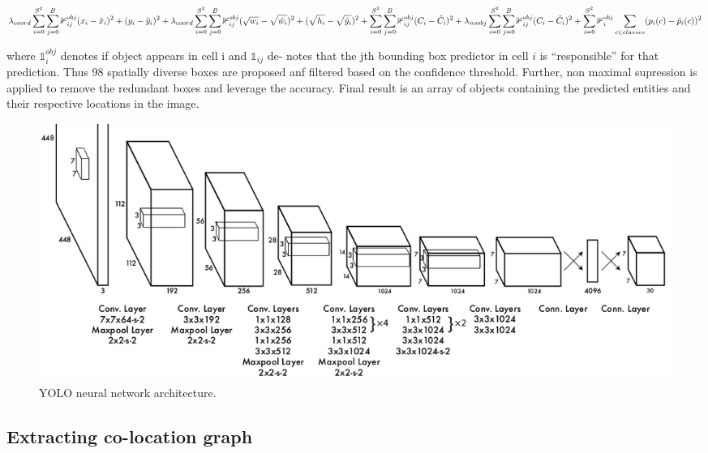 \documentclass[conference]{IEEEtran}
\begin{document}
        \begin{equation}
        \lambda_{coord} \sum_{i=0}^{S^2} \sum_{j=0}^{B} \mathbb{1}_{ij}^{obj}(x_{i} - \hat x_{i})^{2} + (y_{i} - \hat y_{i})^{2} \\
        
        +  \lambda_{coord} \sum_{i=0}^{S^2} \sum_{j=0}^{B} \mathbb{1}_{ij}^{obj} (\sqrt{ w_{i}} - \sqrt{\hat w_{i}})^{2} + (\sqrt{h_{i}} - \sqrt{\hat y_{i}})^{2} \\
        
        +  \sum_{i=0}^{S^2} \sum_{j=0}^{B} \mathbb{1}_{ij}^{obj}(C_{i} - \hat C_{i})^{2} \\
        
        +  \lambda_{noobj} \sum_{i=0}^{S^2} \sum_{j=0}^{B} \mathbb{1}_{ij}^{obj}(C_{i} - \hat C_{i})^{2} \\
        
        +  \sum_{i=0}^{S^2} \mathbb{1}_{i}^{obj} \sum_{c \in classes} (p_{i}(c) - \hat p_{i}(c))^{2}
        \end{equation}
        
       where $ \mathbb{1}^{obj}_{i} $ denotes if object appears in cell i and $ \mathbb{1}_{ij} $ de-
        notes that the jth bounding box predictor in cell $i$ is “responsible” for that prediction. Thus 98 spatially diverse boxes are proposed anf filtered based on the confidence threshold. Further, non maximal supression is applied to remove the redundant boxes and leverage the accuracy. Final result is an array of objects containing the predicted entities and their respective locations in the image.
        


\begin{figure}
  \includegraphics[width=\linewidth]{YOLO}
  \caption{YOLO neural network architecture.}
  \label{fig:YOLO}
\end{figure}

    \subsection{Extracting co-location graph}
        
\end{document}

